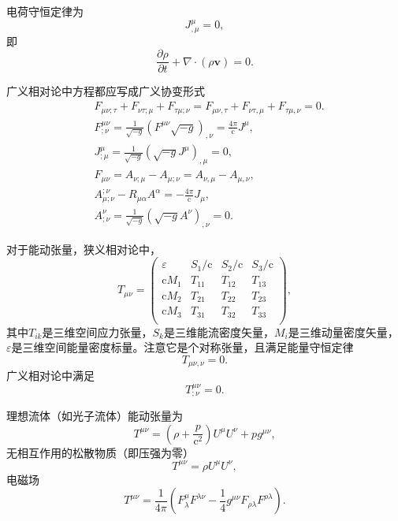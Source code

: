 \documentclass[11pt, a4paper, oneside, onecolumn]{ctexart}
\numberwithin{equation}{subsection}
\begin{document}
电荷守恒定律为
\begin{equation}
J^{\mu}_{,\mu}=0,
\end{equation}
即
\begin{equation}
\frac{\partial{}\rho}{\partial{}t}+\nabla\cdot\left(\rho\boldsymbol{v}\right)=0.
\end{equation}

广义相对论中方程都应写成广义协变形式
\begin{align}
&F_{\mu\nu;\tau}+F_{\nu\tau;\mu}+F_{\tau\mu;\nu}=F_{\mu\nu,\tau}+F_{\nu\tau,\mu}+F_{\tau\mu,\nu}=0.\\
&F^{\mu\nu}_{;\nu}=\frac{1}{\sqrt{-g}}\left(F^{\mu\nu}\sqrt{-g}\right)_{,\nu}=\frac{4\pi}{\mathrm{c}}J^{\mu},\\
&J^{\mu}_{;\mu}=\frac{1}{\sqrt{-g}}\left(\sqrt{-g}J^{\mu}\right)_{,\mu}=0,\\
&F_{\mu\nu}=A_{\nu;\mu}-A_{\mu;\nu}=A_{\nu,\mu}-A_{\mu,\nu},\\
&A_{\mu;\nu}^{;\nu}-R_{\mu\alpha}A^{\alpha}=-\frac{4\pi}{\mathrm{c}}J_{\mu},\\
&A^{\nu}_{;\nu}=\frac{1}{\sqrt{-g}}\left(\sqrt{-g}A^{\nu}\right)_{,\nu}=0.
\end{align}

对于能动张量，狭义相对论中，
\begin{equation}
T_{\mu\nu}=\begin{pmatrix}
\varepsilon & S_{1}/\mathrm{c} & S_{2}/\mathrm{c} & S_{3}/\mathrm{c}\\
\mathrm{c}M_{1} & T_{11} & T_{12} & T_{13}\\
\mathrm{c}M_{2} & T_{21} & T_{22} & T_{23}\\
\mathrm{c}M_{3} & T_{31} & T_{32} & T_{33}\\
\end{pmatrix},
\end{equation}
其中$T_{ik}$是三维空间应力张量，$S_{k}$是三维能流密度矢量，$M_{i}$是三维动量密度矢量，$\varepsilon$是三维空间能量密度标量。注意它是个对称张量，且满足能量守恒定律
\begin{equation}
T_{\mu\nu,\nu}=0.
\end{equation}
广义相对论中满足
\begin{equation}
T^{\mu\nu}_{;\nu}=0.
\end{equation}

理想流体（如光子流体）能动张量为
\begin{equation}
T^{\mu\nu}=\left(\rho+\frac{p}{\mathrm{c}^{2}}\right)U^{\mu}U^{\nu}+pg^{\mu\nu},
\end{equation}
无相互作用的松散物质（即压强为零）
\begin{equation}
T^{\mu\nu}=\rho U^{\mu}U^{\nu},
\end{equation}
电磁场
\begin{equation}
T^{\mu\nu}=\frac{1}{4\pi}\left(F_{\lambda}^{\mu}F^{\lambda\nu}-\frac{1}{4}g^{\mu\nu}F_{\rho\lambda}F^{\rho\lambda}\right).
\end{equation}
\end{document}
